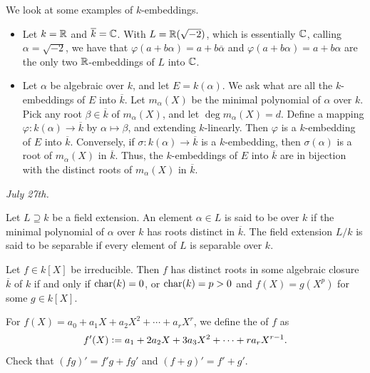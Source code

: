 \begin{example}
    We look at some examples of $k$-embeddings.
    \begin{itemize}
        \item Let $k = \mathbb{R}$ and $\overline{k} = \mathbb{C}$. With $L = \mathbb{R}(\sqrt{-2})$, which is essentially $\mathbb{C}$, calling $\alpha = \sqrt{-2}$, we have that $\varphi(a+b\alpha) = a+b\overline{\alpha}$ and $\varphi(a+b\alpha) = a+b\alpha$ are the only two $\mathbb{R}$-embeddings of $L$ into $\mathbb{C}$.
        \item Let $\alpha$ be algebraic over $k$, and let $E = k(\alpha)$. We ask what are all the $k$-embeddings of $E$ into $\overline{k}$. Let $m_{\alpha}(X)$ be the minimal polynomial of $\alpha$ over $k$. Pick any root $\beta \in \overline{k}$ of $m_{\alpha}(X)$, and let $\deg m_{\alpha}(X) = d$. Define a mapping $\varphi:k(\alpha) \to \overline{k}$ by $\alpha \mapsto \beta$, and extending $k$-linearly. Then $\varphi$ is a $k$-embedding of $E$ into $\overline{k}$. Conversely, if $\sigma:k(\alpha) \to \overline{k}$ is a $k$-embedding, then $\sigma(\alpha)$ is a root of $m_{\alpha}(X)$ in $\overline{k}$. Thus, the $k$-embeddings of $E$ into $\overline{k}$ are in bijection with the distinct roots of $m_{\alpha}(X)$ in $\overline{k}$.
    \end{itemize}
\end{example}

\textit{July 27th.}

\begin{definition}
    Let $L \supseteq k$ be a field extension. An element $\alpha \in L$ is said to be  over $k$ if the minimal polynomial of $\alpha$ over $k$ has roots distinct in $\overline{k}$. The field extension $L/k$ is said to be separable if every element of $L$ is separable over $k$.
\end{definition}

Let $f \in k[X]$ be irreducible. Then $f$ has distinct roots in some algebraic closure $\overline{k}$ of $k$ if and only if $\operatorname{char}(k) = 0$, or $\operatorname{char}(k) = p > 0$ and $f(X) = g(X^{p})$ for some $g \in k[X]$.

For $f(X) = a_{0} + a_{1}X + a_{2}X^{2} + \cdots + a_{r}X^{r}$, we define the  of $f$ as
\begin{align}
    f'(X) \vcentcolon= a_{1} + 2a_{2}X + 3a_{3}X^{2} + \cdots + ra_{r}X^{r-1}.
\end{align}
Check that $(fg)' = f'g + fg'$ and $(f+g)' = f' + g'$.

